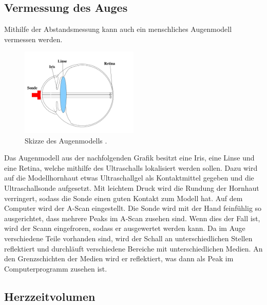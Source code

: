 \newpage
\subsection{Vermessung des Auges}
Mithilfe der Abstandsmessung kann auch ein menschliches Augenmodell vermessen werden.
%
\begin{minipage}[t]{1\textwidth}
    \vspace{-8pt}
    \begin{figure}
        \begin{center}
            \includegraphics[width=0.5\textwidth]{content/Augenmodell.png}
            \caption{Skizze des Augenmodells \cite{Versuchsanleitung_US2}.}
        \end{center}
        \label{fig:Augenmodell}
    \end{figure}
        Das Augenmodell aus der nachfolgenden Grafik besitzt eine Iris, eine Linse und eine Retina, 
        welche mithilfe des Ultraschalls lokalisiert werden sollen.
        Dazu wird auf die Modellhornhaut etwas Ultraschallgel als Kontaktmittel 
        gegeben und die Ultraschallsonde aufgesetzt. Mit leichtem Druck wird die Rundung der Hornhaut 
        verringert, sodass die Sonde einen guten Kontakt zum Modell hat. Auf dem Computer wird der A-Scan 
        eingestellt. Die Sonde wird mit der Hand feinfühlig so ausgerichtet, dass mehrere Peaks im A-Scan 
        zusehen sind. Wenn dies der Fall ist, wird der Scann eingefroren, sodass er ausgewertet werden kann.
        Da im Auge verschiedene Teile vorhanden sind, wird der Schall an unterschiedlichen Stellen 
        reflektiert und durchläuft verschiedene Bereiche mit unterschiedlichen Medien. An den Grenzschichten 
        der Medien wird er reflektiert, was dann als Peak im Computerprogramm zusehen ist. 
\end{minipage}

\subsection{Herzzeitvolumen}

